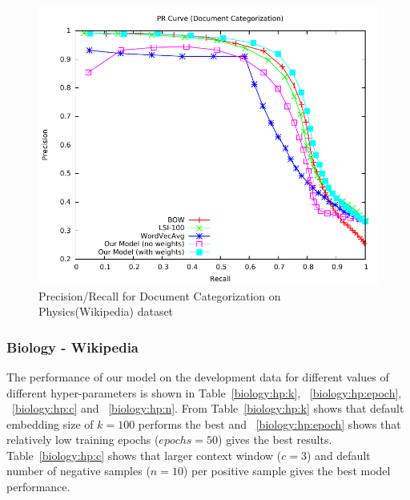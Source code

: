 \begin{figure}[tb]
\centering
        \includegraphics[width=0.8\columnwidth]{figs/pr/physics-cs-scala.pdf}
        \vskip -4mm
    \caption{ Precision/Recall for Document Categorization on Physics(Wikipedia) dataset}
    \label{fig:pr:physics:cs} 
\end{figure}

\subsubsection{Biology - Wikipedia}
The performance of our model on the development data for different values of different hyper-parameters is shown in Table~\ref{biology:hp:k}, ~\ref{biology:hp:epoch}, ~\ref{biology:hp:c} and ~\ref{biology:hp:n}. From Table~\ref{biology:hp:k} shows that default embedding size of $k = 100$ performs the best and ~\ref{biology:hp:epoch} shows that relatively low training epochs ($epochs = 50$) gives the best results. Table~\ref{biology:hp:c} shows that larger context window ($c = 3$) and default number of negative samples ($n = 10$) per positive sample gives the best model performance. 

